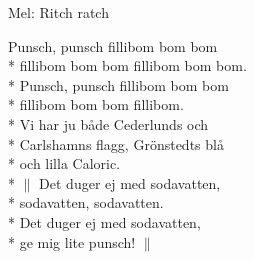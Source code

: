 \begin{SongText}
    \begin{SongInfo}
        Mel: Ritch ratch
    \end{SongInfo}
    \begin{SongVerse}
        Punsch, punsch fillibom bom bom\\*%
        fillibom bom bom fillibom bom bom.\\*%
        Punsch, punsch fillibom bom bom\\*%
        fillibom bom bom fillibom.\\*%
        Vi har ju både Cederlunds och\\*%
        Carlshamns flagg, Grönstedts blå\\*%
        och lilla Caloric.\\*%
        $\|$ Det duger ej med sodavatten,\\*%
        sodavatten, sodavatten.\\*%
        Det duger ej med sodavatten,\\*%
        ge mig lite punsch! $\|$
    \end{SongVerse}
\end{SongText}